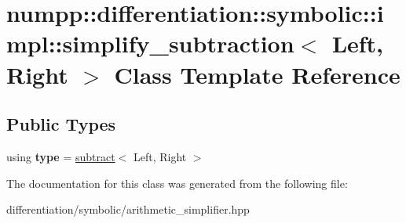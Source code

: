 \hypertarget{classnumpp_1_1differentiation_1_1symbolic_1_1impl_1_1simplify__subtraction}{}\section{numpp\+:\+:differentiation\+:\+:symbolic\+:\+:impl\+:\+:simplify\+\_\+subtraction$<$ Left, Right $>$ Class Template Reference}
\label{classnumpp_1_1differentiation_1_1symbolic_1_1impl_1_1simplify__subtraction}
\subsection*{Public Types}
\begin{DoxyCompactItemize}
\item 
\mbox{\label{classnumpp_1_1differentiation_1_1symbolic_1_1impl_1_1simplify__subtraction_a01f331aacfdaa8100e5240c903374a98}} 
using {\bfseries type} = \hyperlink{classnumpp_1_1differentiation_1_1symbolic_1_1subtract}{subtract}$<$ Left, Right $>$
\end{DoxyCompactItemize}


The documentation for this class was generated from the following file\+:\begin{DoxyCompactItemize}
\item 
differentiation/symbolic/arithmetic\+\_\+simplifier.\+hpp\end{DoxyCompactItemize}
